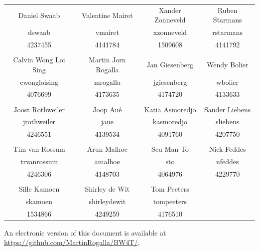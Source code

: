 \begin{titlepage}
\begin{center}
\begin{tabular}{cccc}
Daniel Swaab         & Valentine Mairet    & Xander Zonneveld & Ruben Starmans\\
dswaab               & vmairet             & xzonneveld       & rstarmans\\
4237455              & 4141784             & 1509608          & 4141792\\
                     &                     &                  & \\
Calvin Wong Loi Sing & Martin Jorn Rogalla & Jan Giesenberg   & Wendy Bolier\\
cwongloising         & mrogalla            & jgiesenberg      & wbolier\\
4076699              & 4173635             & 4174720          & 4133633\\
                     &                     &                  & \\
Joost Rothweiler     & Joop Au\'{e}        & Katia Asmoredjo  & Sander Liebens\\
jrothweiler          & jaue                & kasmoredjo       & sliebens\\
4246551              & 4139534             & 4091760          & 4207750\\
                     &                     &                  & \\
Tim van Rossum       & Arun Malhoe         & Seu Man To       & Nick Feddes\\
trvanrossum          & amalhoe             & sto              & nfeddes\\
4246306              & 4148703             & 4064976          & 4229770\\
                     &                     &                  & \\
Sille Kamoen         & Shirley de Wit      & Tom Peeters      & \\
skamoen              & shirleydewit        & tompeeters       & \\
1534866              & 4249259             & 4176510          &
\end{tabular}

\bigskip
\bigskip

\bigskip
\bigskip
An electronic version of this document is available at \url{https://github.com/MartinRogalla/BW4T/}.

\end{center}

\end{titlepage}

